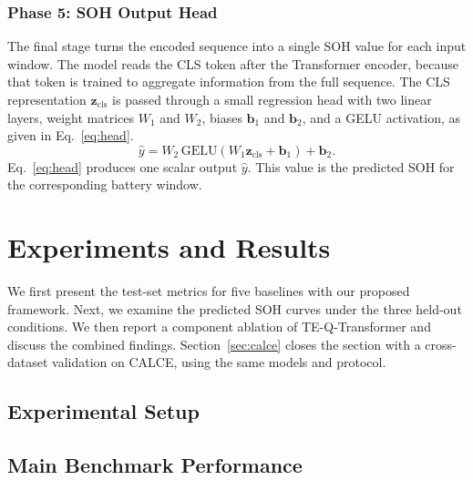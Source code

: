 \documentclass[a4paper,fleqn]{cas-sc}
\begin{document}
\subsubsection{Phase 5: SOH Output Head}
The final stage turns the encoded sequence into a single SOH value for each input window. The model reads the CLS token after the Transformer encoder, because that token is trained to aggregate information from the full sequence. The CLS representation $\mathbf{z}_{\mathrm{cls}}$ is passed through a small regression head with two linear layers, weight matrices $W_{1}$ and $W_{2}$, biases $\mathbf{b}_{1}$ and $\mathbf{b}_{2}$, and a GELU activation, as given in Eq.~\eqref{eq:head}.
\begin{equation}
\hat{y}
=
W_{2}\,\mathrm{GELU}(W_{1}\mathbf{z}_{\mathrm{cls}}+\mathbf{b}_{1})+\mathbf{b}_{2}.
\label{eq:head}
\end{equation}
Eq.~\eqref{eq:head} produces one scalar output $\hat{y}$. This value is the predicted SOH for the corresponding battery window.




\section{Experiments and Results}
\label{sec:results}
We first present the test-set metrics for five baselines with our proposed framework. Next, we examine the predicted SOH curves under the three held-out conditions. We then report a component ablation of TE-Q-Transformer and discuss the combined findings. Section~\ref{sec:calce} closes the section with a cross-dataset validation on CALCE, using the same models and protocol.
\subsection{Experimental Setup}\label{sec:exp-setup}

\subsection{Main Benchmark Performance}\label{sec:nasa}
\end{document}
